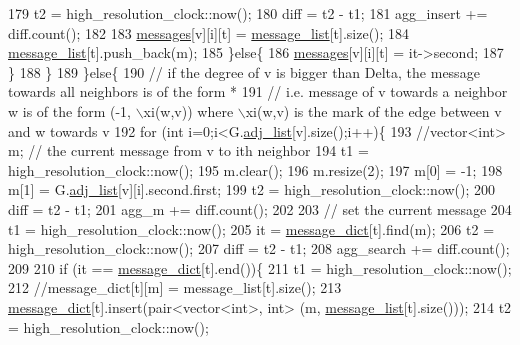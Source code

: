 \begin{DoxyCode}
179             t2 = high\_resolution\_clock::now();
180             diff = t2 - t1;
181             agg\_insert += diff.count();
182 
183             \hyperlink{classgraph__message_aac77e098f0acf9650116a8e51fe3b4b7}{messages}[v][i][t] = \hyperlink{classgraph__message_aa17fdb629b423343edfafa97252763ef}{message\_list}[t].size();
184             \hyperlink{classgraph__message_aa17fdb629b423343edfafa97252763ef}{message\_list}[t].push\_back(m);
185           \}\textcolor{keywordflow}{else}\{
186             \hyperlink{classgraph__message_aac77e098f0acf9650116a8e51fe3b4b7}{messages}[v][i][t] = it->second;
187           \}
188         \}
189       \}\textcolor{keywordflow}{else}\{
190         \textcolor{comment}{// if the degree of v is bigger than Delta, the message towards all neighbors is of the form *}
191         \textcolor{comment}{// i.e. message of v towards a neighbor w is of the form (-1, \(\backslash\)xi(w,v)) where \(\backslash\)xi(w,v) is the mark
       of the edge between v and w towards v}
192         \textcolor{keywordflow}{for} (\textcolor{keywordtype}{int} i=0;i<G.\hyperlink{classmarked__graph_a1a0bf7ca413a278763f7c878b3b6fd6f}{adj\_list}[v].size();i++)\{
193           \textcolor{comment}{//vector<int> m; // the current message from v to ith neighbor}
194           t1 = high\_resolution\_clock::now();
195           m.clear();
196           m.resize(2);
197           m[0] = -1;
198           m[1] = G.\hyperlink{classmarked__graph_a1a0bf7ca413a278763f7c878b3b6fd6f}{adj\_list}[v][i].second.first;
199           t2 = high\_resolution\_clock::now();
200           diff = t2 - t1;
201           agg\_m += diff.count();
202 
203           \textcolor{comment}{// set the current message}
204           t1 = high\_resolution\_clock::now();
205           it = \hyperlink{classgraph__message_ab54d89b122c2b1322da0d5db2043fb84}{message\_dict}[t].find(m);
206           t2 = high\_resolution\_clock::now();
207           diff = t2 - t1;
208           agg\_search += diff.count();
209 
210           \textcolor{keywordflow}{if} (it == \hyperlink{classgraph__message_ab54d89b122c2b1322da0d5db2043fb84}{message\_dict}[t].end())\{
211             t1 = high\_resolution\_clock::now();
212             \textcolor{comment}{//message\_dict[t][m] = message\_list[t].size();}
213             \hyperlink{classgraph__message_ab54d89b122c2b1322da0d5db2043fb84}{message\_dict}[t].insert(pair<vector<int>, \textcolor{keywordtype}{int}> (m, 
      \hyperlink{classgraph__message_aa17fdb629b423343edfafa97252763ef}{message\_list}[t].size()));
214             t2 = high\_resolution\_clock::now();

\end{DoxyCode}
